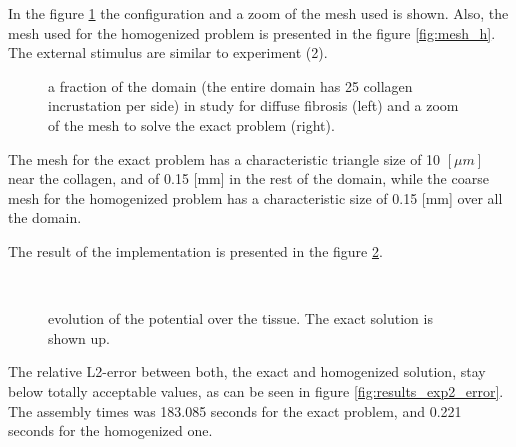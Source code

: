 In the figure \ref{fig:subdomains_R2} the configuration and a zoom of the mesh used is shown. Also, the mesh used for the homogenized problem is presented in the figure \ref{fig:mesh_h}. The external stimulus are similar to experiment (2).

\begin{figure}[H]   
\centering
\caption{ a fraction of the domain (the entire domain has 25 collagen incrustation per side) in study for diffuse fibrosis (left) and a zoom of the mesh to solve the exact problem (right).} \label{fig:subdomains_R2}
\end{figure}

The mesh for the exact problem has a characteristic triangle size of 10 $[\mu m]$ near the collagen, and of 0.15 [mm] in the rest of the domain, while the coarse mesh for the homogenized problem has a characteristic size of 0.15 [mm] over all the domain. 

The result of the implementation is presented in the figure \ref{fig:results_exp2}.

\begin{figure}[H]
\centering
{} \\
\caption{evolution of the potential over the tissue. The exact solution is shown up.} \label{fig:results_exp2}
\end{figure}

The relative L2-error between both, the exact and homogenized solution, stay below totally acceptable values, as can be seen in figure \ref{fig:results_exp2_error}. The  assembly times was 183.085 seconds for the exact problem, and 0.221 seconds for the homogenized one. 

